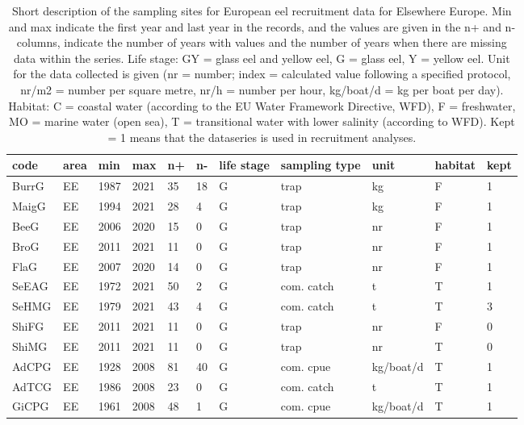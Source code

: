 \begin{table}[ht]
\centering
\caption{Short description of the sampling sites for European eel recruitment data for Elsewhere Europe. Min and max indicate the first year and last year in the records, and the values are given in the n+ and n- columns, indicate the number of years with values and the number of years when there are missing data within the series. Life stage: GY = glass eel and yellow eel, G = glass eel, Y = yellow eel. Unit for the data collected is given (nr = number; index = calculated value following a specified protocol, nr/m2 = number per square metre, nr/h = number per hour, kg/boat/d = kg per boat per day). Habitat: C = coastal water (according to the EU Water Framework Directive, WFD), F = freshwater, MO = marine water (open sea), T = transitional water with lower salinity (according to WFD). Kept = 1 means that the dataseries is used in recruitment analyses.} 
\label{statseriesG}
\begin{tabular}{p{1cm}p{1cm}p{1cm}p{1cm}p{0.8cm}p{0.8cm}p{1cm}p{2cm}p{2cm}p{1cm}p{1cm}}
  \hline
code & area & min & max & n+ & n- & life stage & sampling type & unit & habitat & kept \\ 
  \hline
BurrG & EE & 1987 & 2021 & 35 & 18 & G & trap & kg & F & 1 \\ 
  MaigG & EE & 1994 & 2021 & 28 & 4 & G & trap & kg & F & 1 \\ 
  BeeG & EE & 2006 & 2020 & 15 & 0 & G & trap & nr & F & 1 \\ 
  BroG & EE & 2011 & 2021 & 11 & 0 & G & trap & nr & F & 1 \\ 
  FlaG & EE & 2007 & 2020 & 14 & 0 & G & trap & nr & F & 1 \\ 
  SeEAG & EE & 1972 & 2021 & 50 & 2 & G & com. catch & t & T & 1 \\ 
  SeHMG & EE & 1979 & 2021 & 43 & 4 & G & com. catch & t & T & 3 \\ 
  ShiFG & EE & 2011 & 2021 & 11 & 0 & G & trap & nr & F & 0 \\ 
  ShiMG & EE & 2011 & 2021 & 11 & 0 & G & trap & nr & T & 0 \\ 
  AdCPG & EE & 1928 & 2008 & 81 & 40 & G & com. cpue & kg/boat/d & T & 1 \\ 
  AdTCG & EE & 1986 & 2008 & 23 & 0 & G & com. catch & t & T & 1 \\ 
  GiCPG & EE & 1961 & 2008 & 48 & 1 & G & com. cpue & kg/boat/d & T & 1 \\ 

\end{tabular}
\end{table}
